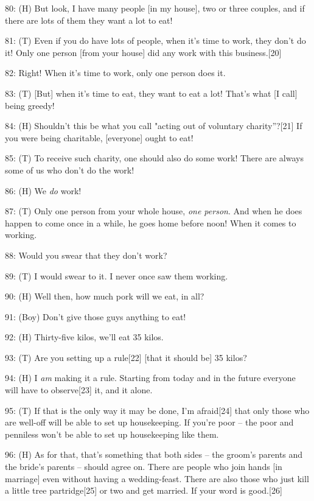 {80: (H) But look, I have many people [in my house], two or three couples,
and if there are lots of them they want a lot to eat!}

{81: (T) Even if you do have lots of people, when it's time to work, they
don't do it! Only one person [from your house] did any work with this business.[20]}

{82: Right! When it's time to work, only one person does it. }

{83: (T) [But] when it's time to eat, they want to eat a lot! That's what
[I call] being greedy! }

{84: (H) Shouldn't this be what you call "acting out of voluntary
charity''?[21] If you were being charitable, [everyone] ought to eat!}

{85: (T) To receive such charity, one should also do some work! There are
always some of us who don't do the work! }

{86: (H) We }{\textit{do }}{work!}

{87: (T) Only one person from your whole house, }{\textit{one person}}{.
And when he does happen to come once in a while, he goes home before noon! When
it comes to working. }

{88: Would you swear that they don't work?}

{89: (T) I would swear to it. I never once saw them working.}

{90: (H) Well then, how much pork will we eat, in all? }

{91: (Boy) Don't give those guys anything to eat!}

{92: (H) Thirty-five kilos, we'll eat 35 kilos.}

{93: (T) Are you setting up a rule[22] [that it should be] 35 kilos?}

{94: (H) I }{\textit{am}}{ making it a rule. Starting from
today and in the future everyone will have to observe[23] it, and it alone.}

{95: (T) If that is the only way it may be done, I'm afraid[24] that only
those who are well-off will be able to set up housekeeping. If you're poor -- the
poor and penniless won't be able to set up housekeeping like them. }

{96: (H) As for that, that's something that both sides -- the groom's parents
and the bride's parents -- should agree on. There are people who join hands [in
marriage] even without having a wedding-feast. There are also those who just kill
a little tree partridge[25] or two and get married. If your word is good.[26]}


